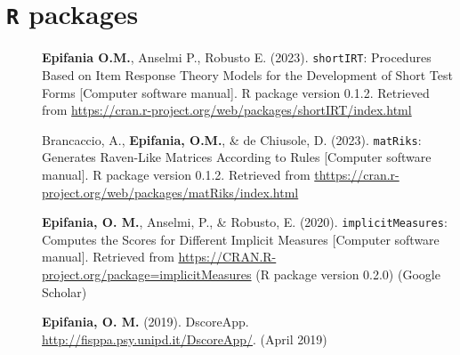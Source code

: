 \documentclass[letterpaper,12pt]{article}
\begin{document}
\section{\texttt{R} packages}
\begin{description}
	\item[] \textbf{Epifania O.M.}, Anselmi P., Robusto E. (2023). \texttt{shortIRT}: Procedures Based on Item Response Theory Models for the
	Development of Short Test Forms [Computer software manual]. R package version 0.1.2. Retrieved from \href{https://cran.r-project.org/web/packages/shortIRT/index.html}{https://cran.r-project.org/web/packages/shortIRT/index.html}
	
	\item[] Brancaccio, A., \textbf{Epifania, O.M.}, \& de Chiusole, D. (2023). \texttt{matRiks}: Generates Raven-Like Matrices According to Rules [Computer software manual]. R package version 0.1.2. Retrieved from \href{https://cran.r-project.org/web/packages/matRiks/index.html}{thttps://cran.r-project.org/web/packages/matRiks/index.html}
	
\item[] \textbf{Epifania, O. M.}, Anselmi, P., \& Robusto, E. (2020). \texttt{implicitMeasures}: Computes the Scores for Different Implicit Measures [Computer software manual]. Retrieved from
\href{https://CRAN.R-project.org/package=implicitMeasures}{https://CRAN.R-project.org/package=implicitMeasures} (R package version 0.2.0) (Google Scholar)


\item[] \textbf{Epifania, O. M.} (2019). DscoreApp. \href{http://fisppa.psy.unipd.it/DscoreApp/}{http://fisppa.psy.unipd.it/DscoreApp/}.  (April 2019)
\end{description}
\end{document}
